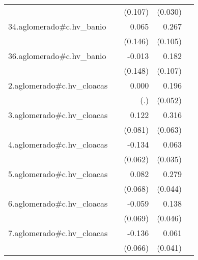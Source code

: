 {\begin{longtable}{l*{4}{D{.}{.}{-1}}}
            &                     &     (0.107)         &     (0.030)         &                     \\
\addlinespace
34.aglomerado#c.hv\_banio&                     &       0.065         &       0.267\sym{*}  &                     \\
            &                     &     (0.146)         &     (0.105)         &                     \\
\addlinespace
36.aglomerado#c.hv\_banio&                     &      -0.013         &       0.182         &                     \\
            &                     &     (0.148)         &     (0.107)         &                     \\
\addlinespace
2.aglomerado#c.hv\_cloacas&                     &       0.000         &       0.196\sym{***}&                     \\
            &                     &         (.)         &     (0.052)         &                     \\
\addlinespace
3.aglomerado#c.hv\_cloacas&                     &       0.122         &       0.316\sym{***}&                     \\
            &                     &     (0.081)         &     (0.063)         &                     \\
\addlinespace
4.aglomerado#c.hv\_cloacas&                     &      -0.134\sym{*}  &       0.063         &                     \\
            &                     &     (0.062)         &     (0.035)         &                     \\
\addlinespace
5.aglomerado#c.hv\_cloacas&                     &       0.082         &       0.279\sym{***}&                     \\
            &                     &     (0.068)         &     (0.044)         &                     \\
\addlinespace
6.aglomerado#c.hv\_cloacas&                     &      -0.059         &       0.138\sym{**} &                     \\
            &                     &     (0.069)         &     (0.046)         &                     \\
\addlinespace
7.aglomerado#c.hv\_cloacas&                     &      -0.136\sym{*}  &       0.061         &                     \\
            &                     &     (0.066)         &     (0.041)         &                     \\

\end{longtable}}
